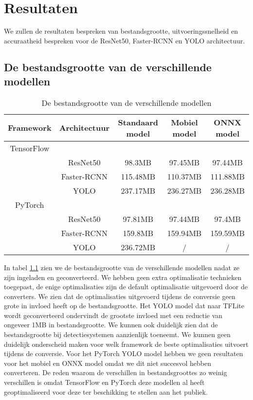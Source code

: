 \chapter{Resultaten}
We zullen de resultaten bespreken van bestandsgrootte, uitvoeringssnelheid en accuraatheid bespreken voor de ResNet50, Faster-RCNN en YOLO architectuur.

\section{De bestandsgrootte van de verschillende modellen}

\begin{table}[!ht]
    \caption{De bestandsgrootte van de verschillende modellen}
\begin{tabular}{ccccc}
    \hline
    Framework & Architectuur & Standaard model & Mobiel model & ONNX model \\
    \hline
    TensorFlow & & & \\
     & ResNet50 & 98.3MB & 97.45MB & 97.44MB \\
     & Faster-RCNN & 115.48MB & 110.37MB & 111.88MB \\
     & YOLO & 237.17MB & 236.27MB & 236.28MB \\
    PyTorch & & & \\
     & ResNet50 & 97.81MB & 97.44MB & 97.4MB \\
     & Faster-RCNN & 159.8MB & 159.94MB & 159.59MB \\
     & YOLO & 236.72MB & / & / \\
    \hline
\end{tabular}
\label{tab:size}
\end{table}

In tabel \ref{tab:size} zien we de bestandsgrootte van de verschillende modellen nadat ze zijn ingeladen en geconverteerd.
We hebben geen extra optimalisatie technieken toegepast, de enige optimalisaties zijn de default optimalisatie uitgevoerd door de converters.
We zien dat de optimalisaties uitgevoerd tijdens de conversie geen grote in invloed heeft op de bestandsgrootte.
Het YOLO model dat naar TFLite wordt geconverteerd ondervindt de grootste invloed met een reductie van ongeveer 1MB in bestandsgrootte.
We kunnen ook duidelijk zien dat de bestandsgrootte bij detectiesystemen aanzienlijk toeneemt.
We kunnen geen duidelijk onderscheid maken voor welk framework de beste optimalisaties uitvoert tijdens de conversie.
Voor het PyTorch YOLO model hebben we geen resultaten voor het mobiel en ONNX model omdat we dit niet succesvol hebben converteren.
De reden waarom de verschillen in bestandsgroottes zo weinig verschillen is omdat TensorFlow en PyTorch deze modellen al heeft geoptimaliseerd voor deze ter beschikking te stellen aan het publiek.

